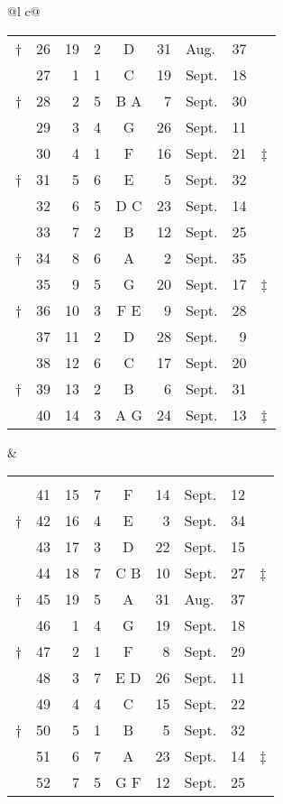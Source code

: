 \begin{tabular}{@{}l c@{}}
\begin{tabular}[t]{@{}r rrcc r@{~}l r l@{}}
† & 26 & 19 &  2 &  D  & 31 & Aug.  & 37 & ~ \\
~ & 27 &  1 &  1 &  C  & 19 & Sept. & 18 \\
† & 28 &  2 &  5 & B A &  7 & Sept. & 30 \\
\cmidrule{2-8}
~ & 29 &  3 &  4 &  G  & 26 & Sept. & 11 \\
~ & 30 &  4 &  1 &  F  & 16 & Sept. & 21 & ‡ \\
† & 31 &  5 &  6 &  E  &  5 & Sept. & 32 \\
~ & 32 &  6 &  5 & D C & 23 & Sept. & 14 \\
\cmidrule{2-8}
~ & 33 &  7 &  2 &  B  & 12 & Sept. & 25 \\
† & 34 &  8 &  6 &  A  &  2 & Sept. & 35 \\
~ & 35 &  9 &  5 &  G  & 20 & Sept. & 17 & ‡ \\
† & 36 & 10 &  3 & F E &  9 & Sept. & 28 \\
\cmidrule{2-8}
~ & 37 & 11 &  2 &  D  & 28 & Sept. &  9 \\
~ & 38 & 12 &  6 &  C  & 17 & Sept. & 20 \\
† & 39 & 13 &  2 &  B  &  6 & Sept. & 31 \\
~ & 40 & 14 &  3 & A G & 24 & Sept. & 13 & ‡ \\
\cmidrule{2-8}
\end{tabular}
&
\begin{tabular}[t]{@{}r rrcc r@{~}l r l@{}}
\hdrs
\\
\cmidrule{2-8}
~ & 41 & 15 &  7 &  F  & 14 &Sept. & 12 \\
† & 42 & 16 &  4 &  E  &  3 &Sept. & 34 \\
~ & 43 & 17 &  3 &  D  & 22 &Sept. & 15 & ~ \\
~ & 44 & 18 &  7 & C B & 10 &Sept. & 27 & ‡ \\
\cmidrule{2-8}
† & 45 & 19 &  5 &  A  & 31 &Aug.  & 37 \\
~ & 46 &  1 &  4 &  G  & 19 &Sept. & 18 \\
† & 47 &  2 &  1 &  F  &  8 &Sept. & 29 \\
~ & 48 &  3 &  7 & E D & 26 &Sept. & 11 \\
\cmidrule{2-8}
~ & 49 &  4 &  4 &  C  & 15 &Sept. & 22 \\
† & 50 &  5 &  1 &  B  &  5 &Sept. & 32 \\
~ & 51 &  6 &  7 &  A  & 23 &Sept. & 14 & ‡ \\
~ & 52 &  7 &  5 & G F & 12 &Sept. & 25 \\
\cmidrule{2-8}

\end{tabular}
\end{tabular}
